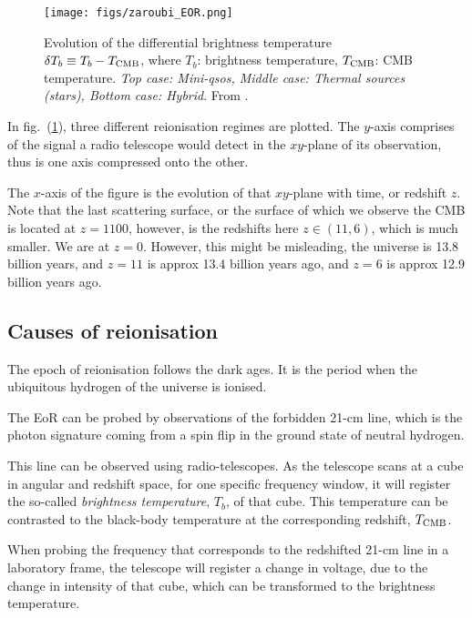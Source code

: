 \documentclass[ignorenonframetext]{beamer}
\begin{document}
\begin{frame}
    \begin{figure}[htb]
        \centering
        \texttt{[image: figs/zaroubi\_EOR.png]}
        \caption{ Evolution of the differential brightness temperature $\delta T_b \equiv T_b - T_{\rm CMB}$, where $T_b$: brightness temperature, $T_{\rm CMB}$: CMB temperature. {\em Top case: Mini-qsos, Middle case: Thermal sources (stars), Bottom case: Hybrid}. From . }
        \label{fig:1_EOR}
    \end{figure}

\end{frame}

In fig.~(\ref{fig:1_EOR}), three different reionisation regimes are plotted. The $y$-axis comprises of the signal a radio telescope would detect in the $xy$-plane of its observation, thus is one axis compressed onto the other.

The $x$-axis of the figure is the evolution of that $xy$-plane with time, or redshift $z$. Note that the last scattering surface, or the surface of which we observe the CMB is located at $z=1100$, however, is the redshifts here $z\in (11,6)$, which is much smaller. We are at $z=0$. However, this might be misleading, the universe is 13.8 billion years, and $z=11$ is approx 13.4 billion years ago, and $z=6$ is approx 12.9 billion years ago. 

\subsection{Causes of reionisation}
The epoch of reionisation follows the dark ages. It is the period when the ubiquitous hydrogen of the universe is ionised.

The EoR can be probed by observations of the forbidden 21-cm line, which is the photon signature coming from a spin flip in the ground state of neutral hydrogen. 

This line can be observed using radio-telescopes. As the telescope scans at a cube in angular and redshift space, for one specific frequency window, it will register the so-called \textit{brightness temperature}, $T_b$, of that cube. This temperature can be contrasted to the black-body temperature at the corresponding redshift, $T_{\rm CMB}$. 

When probing the frequency that corresponds to the redshifted 21-cm line in a laboratory frame, the telescope will register a change in voltage, due to the change in intensity of that cube, which can be transformed to the brightness temperature. 
\end{document}
